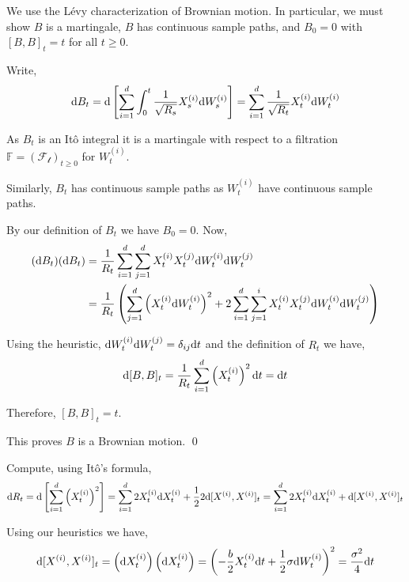 \begin{solution}[Solution]
We use the  L\'evy characterization of Brownian motion. In particular, we must show \( B \) is a martingale, \( B \) has continuous sample paths, and \( B_0 = 0 \) with \( [B,B]_t = t \) for all \( t\geq 0 \).

Write,
\begin{align*}
    \mathrm{d} B_t = \mathrm{d} \left[ \sum_{i=1}^{d} \int_{0}^{t} \dfrac{1}{\sqrt{R_s}}X_s^{(i)} \mathrm{d} W_s^{(i)} \right] = \sum_{i=1}^{d} \dfrac{1}{\sqrt{R_t}}X_t^{(i)} \mathrm{d} W_t^{(i)}
\end{align*}


As \( B_t \) is an It\^o integral it is a martingale with respect to a filtration \( \mathbb{F} = ( \mathcal{F_t} )_{t\geq 0} \) for \( W_t^{(i)} \).

Similarly, \( B_t \) has continuous sample paths as \( W_t^{(i)} \) have continuous sample paths.

By our definition of \( B_t \) we have \( B_0 = 0 \).
Now, 
\begin{align*}
    (\mathrm{d} B_t)(\mathrm{d} B_t) &= \dfrac{1}{R_t} \sum_{i=1}^{d}\sum_{j=1}^{d}X_t^{(i)}X_t^{(j)} \mathrm{d} W_t^{(i)} \mathrm{d} W_t^{(j)} \\
    &= \dfrac{1}{R_t} \left( \sum_{j=1}^{d} \left(X_t^{(i)} \mathrm{d} W_t^{(i)}\right)^2  + 2\sum_{i=1}^{d}\sum_{j=1}^{i} X_t^{(i)}X_t^{(j)} \mathrm{d} W_t^{(i)} \mathrm{d} W_t^{(j)} \right) 
\end{align*}

Using the heuristic, \( \mathrm{d} W_t^{(i)} \mathrm{d} W_t^{(j)} = \delta_{ij} \mathrm{d} t \) and the definition of \( R_t \) we have,
\begin{align*}
    \mathrm{d}[B,B]_t = \dfrac{1}{R_t} \sum_{i=1}^{d} \left( X_t^{(i)} \right)^2 \mathrm{d} t = \mathrm{d} t
\end{align*}

Therefore, \( [B,B]_t = t \).

This proves \( B \) is a Brownian motion. \qed

Compute, using It\^o's formula,
\begin{align*}
    \mathrm{d} R_t 
    = \mathrm{d} \left[ \sum_{i=1}^{d} \left( X_t^{(i)} \right)^2 \right]
    = \sum_{i=1}^{d} 2 X_t^{(i)} \mathrm{d} X_t^{(i)} + \frac{1}{2} 2 \mathrm{d} [X^{(i)},X^{(i)}] _t 
    = \sum_{i=1}^{d} 2X_t^{(i)} \mathrm{d} X_t^{(i)} + \mathrm{d}[X^{(i)},X^{(i)}]_t
\end{align*}

Using our heuristics we have,
\begin{align*}
    \mathrm{d}[X^{(i)},X^{(i)}]_t = \left( \mathrm{d} X_t^{(i)} \right) \left(\mathrm{d} X_t^{(i)} \right) 
    = \left( -\dfrac{b}{2} X_t^{(i)} \mathrm{d} t + \dfrac{1}{2}\sigma \mathrm{d} W_t^{(i)} \right)^2 
    = \dfrac{\sigma^2}{4} \mathrm{d} t
\end{align*}


\end{solution}
